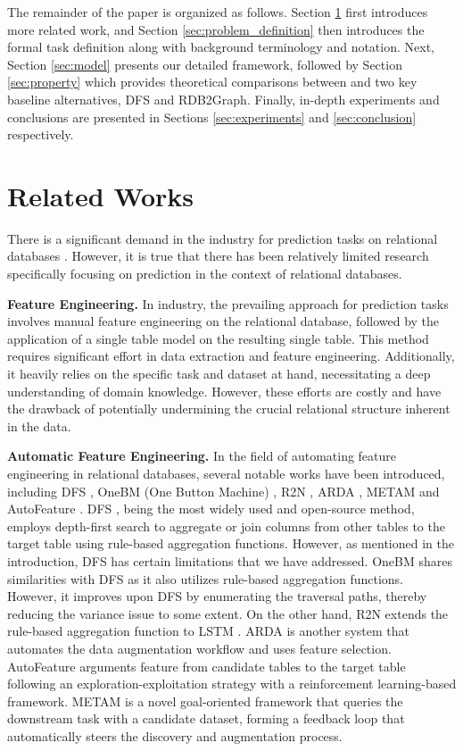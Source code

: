 The remainder of the paper is organized as follows. Section \ref{sec:related_works} first introduces more related work, and Section \ref{sec:problem_definition} then introduces the formal task definition along with background terminology and notation.  Next, Section \ref{sec:model} presents our detailed \model{} framework, followed by Section \ref{sec:property} which provides theoretical comparisons between \model{} and two key baseline alternatives, DFS and RDB2Graph. Finally, in-depth experiments and conclusions are presented in Sections \ref{sec:experiments} and \ref{sec:conclusion} respectively.

\section{Related Works}
\label{sec:related_works}
There is a significant demand in the industry for prediction tasks on relational databases \cite{netz2000integration, park2022end, aggarwal2012analysis, shahbaz2010data, fernandez2018aurum}.
However, it is true that there has been relatively limited research specifically focusing on prediction in the context of relational databases.

\header
\textbf{Feature Engineering.}
In industry, the prevailing approach for prediction tasks involves manual feature engineering on the relational database, followed by the application of a single table model on the resulting single table\cite{park2022end, rendle2010factorization,qu2018product}.
This method requires significant effort in data extraction and feature engineering. Additionally, it heavily relies on the specific task and dataset at hand, necessitating a deep understanding of domain knowledge. However, these efforts are costly and have the drawback of potentially undermining the crucial relational structure inherent in the data.

\header
\textbf{Automatic Feature Engineering.}
In the field of automating feature engineering in relational databases, several notable works have been introduced, including DFS \cite{kanter2015deep}, OneBM (One Button Machine) \cite{lam2017one}, R2N \cite{lam2018neural}, ARDA \cite{arda}, METAM \cite{galhotra2023metam} and AutoFeature \cite{liu2022feature}. DFS \cite{kanter2015deep}, being the most widely used and open-source method, employs depth-first search to aggregate or join columns from other tables to the target table using rule-based aggregation functions. However, as mentioned in the introduction, DFS has certain limitations that we have addressed. 
OneBM shares similarities with DFS as it also utilizes rule-based aggregation functions. However, it improves upon DFS by enumerating the traversal paths, thereby reducing the variance issue to some extent. On the other hand, R2N extends the rule-based aggregation function to LSTM \cite{hochreiter1997long}. ARDA is another system that automates the data augmentation workflow and uses feature selection. AutoFeature arguments feature from candidate tables to the target table following an exploration-exploitation strategy with a reinforcement learning-based framework. METAM is a novel goal-oriented framework that queries the downstream task with a candidate dataset, forming a feedback loop that automatically steers the discovery and augmentation process. 

